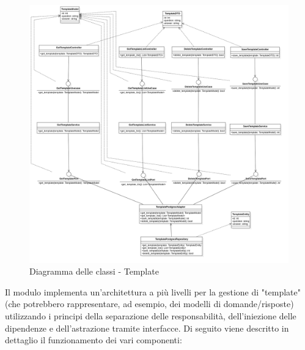    \begin{figure}[H]
        \centering
        \includegraphics[width=\linewidth, height=0.8\textheight, keepaspectratio]{./img/png/Model7!Template_7.png}
        \caption{Diagramma delle classi - Template}
        \label{fig:template}
    \end{figure}

    Il modulo implementa un'architettura a più livelli per la gestione di "template" (che potrebbero rappresentare, ad esempio, dei modelli di domande/risposte) utilizzando i principi della separazione delle responsabilità, dell'iniezione delle dipendenze e dell'astrazione tramite interfacce. Di seguito viene descritto in dettaglio il funzionamento dei vari componenti:
    
